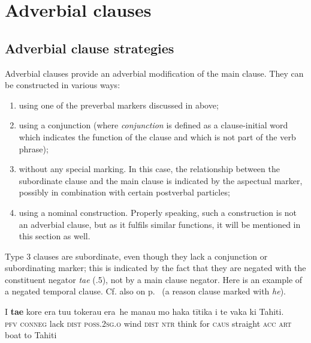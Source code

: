\section{Adverbial clauses}\label{sec:11.6}
\subsection{Adverbial clause strategies}\label{sec:11.6.1}

Adverbial clauses provide an adverbial modification of the main clause. They can be constructed in various ways:

\begin{enumerate}
\item 
using one of the preverbal markers discussed in  above;

\item 
using a conjunction (where \textit{conjunction} is defined as a clause-initial word which indicates the function of the clause and which is not part of the verb phrase);

\item 
without any special marking. In this case, the relationship between the subordinate clause and the main clause is indicated by the aspectual marker, possibly in combination with certain postverbal particles;

\item 
using a nominal construction. Properly speaking, such a construction is not an adverbial clause, but as it fulfils similar functions, it will be mentioned in this section as well.

\end{enumerate}

Type 3 clauses are subordinate, even though they lack a conjunction or subordinating marker; this is indicated by the fact that they are negated with the constituent negator \textit{ta{\ꞌ}e} (.5), not by a main clause negator. Here is an example of a negated temporal clause. Cf. also  on p.~\pageref{ex:11.257} (a reason clause marked with \textit{he}).

\ea\label{ex:11.210}
\gll {\ob}I \textbf{ta{\ꞌ}e} kore era tu{\ꞌ}u tokerau era\,{\cb} he mana{\ꞌ}u mo haka tītika  i te vaka ki Tahiti.\\
{\db}\textsc{pfv} \textsc{conneg} lack \textsc{dist} \textsc{poss.2sg.o} wind \textsc{dist} \textsc{ntr} think for \textsc{caus} straight  \textsc{acc} \textsc{art} boat to Tahiti\\

